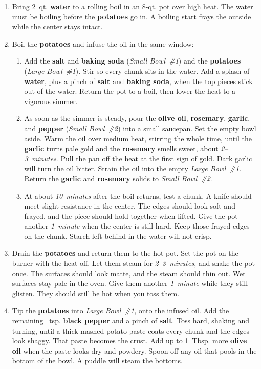 \documentclass[11pt,letterpaper]{article}
\begin{document}
\begin{enumerate}
    \item Bring 2~qt. \textbf{water} to a rolling boil in an 8-qt. pot over high heat. The water must be boiling before the \textbf{potatoes} go in. A boiling start frays the outside while the center stays intact.

    \item Boil the \textbf{potatoes} and infuse the oil in the same window:
    \begin{enumerate}
        \item Add the \textbf{salt} and \textbf{baking soda} (\textit{Small Bowl~\#1}) and the \textbf{potatoes} (\textit{Large Bowl~\#1}). Stir so every chunk sits in the water. Add a splash of \textbf{water}, plus a pinch of \textbf{salt} and \textbf{baking soda}, when the top pieces stick out of the water. Return the pot to a boil, then lower the heat to a vigorous simmer.
        \item As soon as the simmer is steady, pour the \textbf{olive oil}, \textbf{rosemary}, \textbf{garlic}, and \textbf{pepper} (\textit{Small Bowl~\#2}) into a small saucepan. Set the empty bowl aside. Warm the oil over medium heat, stirring the whole time, until the \textbf{garlic} turns pale gold and the \textbf{rosemary} smells sweet, about \textit{2--3~minutes}. Pull the pan off the heat at the first sign of gold. Dark garlic will turn the oil bitter. Strain the oil into the empty \textit{Large Bowl~\#1}. Return the \textbf{garlic} and \textbf{rosemary} solids to \textit{Small Bowl~\#2}.
        \item At about \textit{10~minutes} after the boil returns, test a chunk. A knife should meet slight resistance in the center. The edges should look soft and frayed, and the piece should hold together when lifted. Give the pot another \textit{1~minute} when the center is still hard. Keep those frayed edges on the chunk. Starch left behind in the water will not crisp.
    \end{enumerate}

    \item Drain the \textbf{potatoes} and return them to the hot pot. Set the pot on the burner with the heat off. Let them steam for \textit{2--3~minutes}, and shake the pot once. The surfaces should look matte, and the steam should thin out. Wet surfaces stay pale in the oven. Give them another \textit{1~minute} while they still glisten. They should still be hot when you toss them.

    \item Tip the \textbf{potatoes} into \textit{Large Bowl~\#1}, onto the infused oil. Add the remaining ~tsp. \textbf{black pepper} and a pinch of \textbf{salt}. Toss hard, shaking and turning, until a thick mashed-potato paste coats every chunk and the edges look shaggy. That paste becomes the crust. Add up to 1~Tbsp. more \textbf{olive oil} when the paste looks dry and powdery. Spoon off any oil that pools in the bottom of the bowl. A puddle will steam the bottoms.


\end{enumerate}
\end{document}
